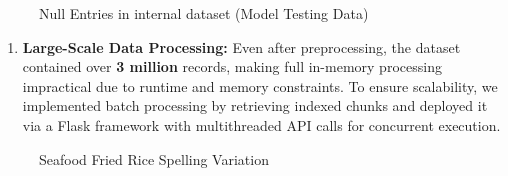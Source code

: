 \documentclass[
  11pt,
  a4paper,
  DIV=11,
  numbers=noendperiod]{scrartcl}
\providecommand{\tightlist}{%
  \setlength{\itemsep}{0pt}\setlength{\parskip}{0pt}}\usepackage{longtable,booktabs,array}
\begin{document}
\begin{figure}

\caption{\label{fig-null-internal}Null Entries in internal dataset
(Model Testing Data)}


\end{figure}%

\begin{enumerate}
\def\labelenumi{\arabic{enumi}.}
\setcounter{enumi}{1}
\tightlist
\item
  \textbf{Large-Scale Data Processing:} Even after preprocessing, the
  dataset contained over \textbf{3 million} records, making full
  in-memory processing impractical due to runtime and memory
  constraints. To ensure scalability, we implemented batch processing by
  retrieving indexed chunks and deployed it via a Flask framework with
  multithreaded API calls for concurrent execution.
\end{enumerate}

\begin{figure}

\caption{\label{fig-seafood-fried-rice-var}Seafood Fried Rice Spelling
Variation}


\end{figure}%
\end{document}
